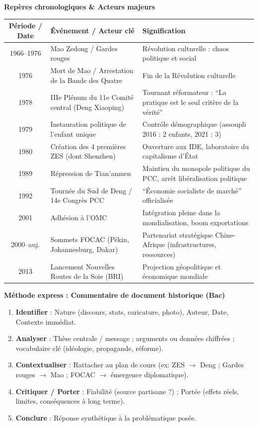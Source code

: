 \documentclass[11pt]{article}
\newcommand{\cle}[1]{{\popxbold\color{popdark}#1}}
\begin{document}
\begin{bilan}
\textbf{Rep\`eres chronologiques \& Acteurs majeurs}
\begin{center}
\begin{tabularx}{\linewidth}{|c|X|X|}\hline
\textbf{P\'eriode / Date} & \textbf{\'Ev\'enement / Acteur cl\'e} & \textbf{Signification} \\ \hline
1966--1976 & Mao Zedong / Gardes rouges & R\'evolution culturelle : chaos politique et social \\ \hline
1976 & Mort de Mao / Arrestation de la \cle{Bande des Quatre} & Fin de la R\'evolution culturelle \\ \hline
1978 & IIIe Pl\'enum du 11e Comit\'e central (Deng Xiaoping) & Tournant r\'eformateur : ``La pratique est le seul crit\`ere de la v\'erit\'e'' \\ \hline
1979 & Instauration politique de \cle{l'enfant unique} & Contr\^ole d\'emographique (assoupli 2016 : 2 enfants, 2021 : 3) \\ \hline
1980 & Cr\'eation des 4 premi\`eres \cle{ZES} (dont Shenzhen) & Ouverture aux IDE, laboratoire du capitalisme d'\'Etat \\ \hline
1989 & R\'epression de Tian'anmen & Maintien du monopole politique du PCC, arr\^et lib\'eralisation politique \\ \hline
1992 & Tourn\'ee du Sud de Deng / 14e Congr\`es PCC & ``\'Economie socialiste de march\'e'' officialis\'ee \\ \hline
2001 & Adh\'esion \`a l'\cle{OMC} & Int\'egration pleine dans la mondialisation, boom exportations \\ \hline
2000--auj. & Sommets \cle{FOCAC} (P\'ekin, Johannesburg, Dakar) & Partenariat strat\'egique Chine-Afrique (infrastructures, ressources) \\ \hline
2013 & Lancement \cle{Nouvelles Routes de la Soie} (BRI) & Projection g\'eopolitique et \'economique mondiale \\ \hline
\end{tabularx}
\end{center}

\textbf{M\'ethode express : Commentaire de document historique (Bac)}
\begin{enumerate}
  \item \textbf{Identifier} : Nature (discours, stats, caricature, photo), Auteur, Date, Contexte imm\'ediat.
  \item \textbf{Analyser} : Th\`ese centrale / message ; arguments ou donn\'ees chiffr\'ees ; vocabulaire cl\'e (id\'eologie, propagande, r\'eforme).
  \item \textbf{Contextualiser} : Rattacher au plan de cours (ex: ZES $\rightarrow$ Deng ; Gardes rouges $\rightarrow$ Mao ; FOCAC $\rightarrow$ \'emergence diplomatique).
  \item \textbf{Critiquer / Porter} : Fiabilit\'e (source partisane ?) ; Port\'ee (effets r\'eels, limites, cons\'equences \`a long terme).
  \item \textbf{Conclure} : R\'eponse synth\'etique \`a la probl\'ematique pos\'ee.
\end{enumerate}
\end{bilan}
\end{document}
